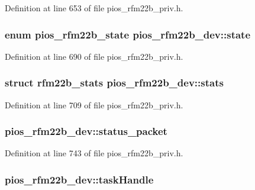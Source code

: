 Definition at line 653 of file pios\-\_\-rfm22b\-\_\-priv.\-h.

\hypertarget{structpios__rfm22b__dev_a2725ce50c0aad0fae1e4cee8e29072f7}{
\subsubsection[{state}]{\setlength{\rightskip}{0pt plus 5cm}enum {\bf pios\-\_\-rfm22b\-\_\-state} pios\-\_\-rfm22b\-\_\-dev\-::state}}\label{structpios__rfm22b__dev_a2725ce50c0aad0fae1e4cee8e29072f7}


Definition at line 690 of file pios\-\_\-rfm22b\-\_\-priv.\-h.

\hypertarget{structpios__rfm22b__dev_abb8511852ba38b8de9c19aaae6a495f0}{
\subsubsection[{stats}]{\setlength{\rightskip}{0pt plus 5cm}struct {\bf rfm22b\-\_\-stats} pios\-\_\-rfm22b\-\_\-dev\-::stats}}\label{structpios__rfm22b__dev_abb8511852ba38b8de9c19aaae6a495f0}


Definition at line 709 of file pios\-\_\-rfm22b\-\_\-priv.\-h.

\hypertarget{structpios__rfm22b__dev_a655ec6ecb5828af1262a9108c8fb25f7}{
\subsubsection[{status\-\_\-packet}]{ pios\-\_\-rfm22b\-\_\-dev\-::status\-\_\-packet}}\label{structpios__rfm22b__dev_a655ec6ecb5828af1262a9108c8fb25f7}


Definition at line 743 of file pios\-\_\-rfm22b\-\_\-priv.\-h.

\hypertarget{structpios__rfm22b__dev_a28c619aaf7379eacea11f08847223cc2}{
\subsubsection[{task\-Handle}]{ pios\-\_\-rfm22b\-\_\-dev\-::task\-Handle}}\label{structpios__rfm22b__dev_a28c619aaf7379eacea11f08847223cc2}


